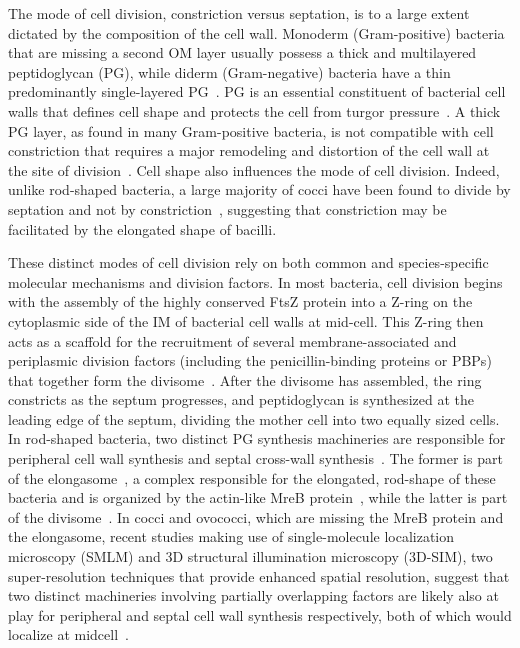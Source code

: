 The mode of cell division, constriction versus septation, is to a large extent dictated by the composition of the cell wall.
Monoderm (Gram-positive) bacteria that are missing a second OM layer usually possess a thick and multilayered peptidoglycan (PG), while diderm (Gram-negative) bacteria have a thin predominantly single-layered PG~\cite{gardePeptidoglycanStructureSynthesis2021}.
PG is an essential constituent of bacterial cell walls that defines cell shape and protects the cell from turgor pressure~\cite{gardePeptidoglycanStructureSynthesis2021}.
A thick PG layer, as found in many Gram-positive bacteria, is not compatible with cell constriction that requires a major remodeling and distortion of the cell wall at the site of division~\cite{nguyenSimulationsSuggestConstrictive2019}.
Cell shape also influences the mode of cell division.
Indeed, unlike rod-shaped bacteria, a large majority of cocci have been found to divide by septation and not by constriction~\cite{zapunDifferentShapesCocci2008,pinhoHowGetMechanisms2013}, suggesting that constriction may be facilitated by the elongated shape of bacilli.

These distinct modes of cell division rely on both common and species-specific molecular mechanisms and division factors.
In most bacteria, cell division begins with the assembly of the highly conserved FtsZ protein into a Z-ring on the cytoplasmic side of the IM of bacterial cell walls at mid-cell.
This Z-ring then acts as a scaffold for the recruitment of several membrane-associated and periplasmic division factors (including the penicillin-binding proteins or PBPs) that together form the divisome~\cite{pinhoHowGetMechanisms2013}.
After the divisome has assembled, the ring constricts as the septum progresses, and peptidoglycan is synthesized at the leading edge of the septum, dividing the mother cell into two equally sized cells.
In rod-shaped bacteria, two distinct PG synthesis machineries are responsible for peripheral cell wall synthesis and septal cross-wall synthesis~\cite{eganRegulationPeptidoglycanSynthesis2020}.
The former is part of the elongasome~\cite{eganRegulationPeptidoglycanSynthesis2020}, a complex responsible for the elongated, rod-shape of these bacteria and is organized by the actin-like MreB protein~\cite{eganRegulationBacterialCell2017}, while the latter is part of the divisome~\cite{duAssemblyActivationEscherichia2017,denblaauwenDivisome25Road2017}.
In cocci and ovococci, which are missing the MreB protein and the elongasome, recent studies making use of single-molecule localization microscopy (SMLM) and 3D structural illumination microscopy (3D-SIM), two super-resolution techniques that provide enhanced spatial resolution, suggest that two distinct machineries involving partially overlapping factors are likely also at play for peripheral and septal cell wall synthesis respectively, both of which would localize at midcell~\cite{pinhoHowGetMechanisms2013,trouveNanoscaleDynamicsPeptidoglycan2021,perezOrganizationPeptidoglycanSynthesis2021,perez-nunezNewMorphogenesisPathway2011,lundMolecularCoordinationStaphylococcus2018}.


